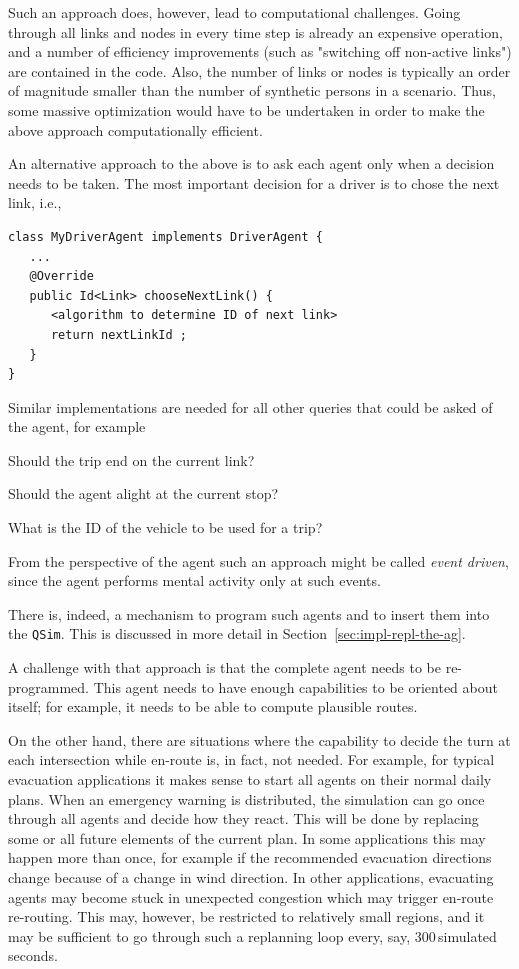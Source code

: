 Such an approach does, however, lead to computational challenges. Going through all links and nodes in every time step is already an expensive operation, and a number of efficiency improvements (such as "switching off non-active links") are contained in the code.  Also, the number of links or nodes is typically an order of magnitude smaller than the number of synthetic persons in a scenario. Thus, some massive optimization would have to be undertaken in order to make the above approach computationally efficient.

An alternative approach to the above is to ask each agent only when a decision needs to be taken. The most important decision for a driver is to chose the next link, i.e.,\,\begin{lstlisting}
class MyDriverAgent implements DriverAgent {
   ...
   @Override
   public Id<Link> chooseNextLink() {
      <algorithm to determine ID of next link>
      return nextLinkId ;
   }
}
\end{lstlisting}
%
Similar implementations are needed for all other queries that could be asked of the agent, for example
\begin{compactitem}
\item Should the trip end on the current link?
\item Should the agent alight at the current stop?
\item What is the ID of the vehicle to be used for a trip?
\end{compactitem}
%
From the perspective of the agent such an approach might be called \emph{event driven}, since the agent performs mental activity only at such events.

There is, indeed, a mechanism to program such agents and to insert
them into the \lstinline$QSim$. This is discussed in more detail in Section~\ref{sec:impl-repl-the-ag}.

A challenge with that approach is that the complete agent needs to be re-programmed.  This agent needs to have enough capabilities to be oriented about itself; for example, it needs to be able to compute plausible routes.

On the other hand, there are situations where the capability to decide the turn at each intersection while en-route is, in fact, not needed.  
%
For example, for typical evacuation applications it makes sense to start all agents on their normal daily plans. When an emergency warning is distributed, the simulation can go once through all agents and decide how they react.  This will be done by replacing some or all future elements of the current plan.  In some applications this may happen more than once, for example if the recommended evacuation directions change because of a change in wind direction.  In other applications, evacuating agents may become stuck in unexpected congestion which may trigger en-route re-routing. This may, however, be restricted to relatively small regions, and it may be sufficient to go through such a replanning loop every, say, 300\,simulated seconds. 

